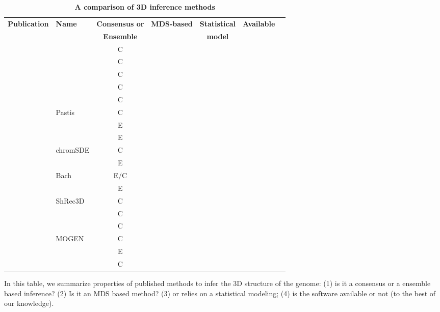 \documentclass[letterpaper,12pt]{article}
\newcommand*\CHECK{\ding{51}}
\begin{document}
\begin{table}[ht!]
\begin{center}
\footnotesize
\begin{tabular}{rlccccc}
\hline
\multirow{2}{*}{\textbf{\footnotesize Publication}} & \multirow{2}{*}{\textbf{\footnotesize Name}} &
\textbf{\footnotesize Consensus or} 
&\multirow{2}{*}{\textbf{\footnotesize MDS-based}} & \textbf{\footnotesize Statistical} &
\multirow{2}{*}{\textbf{\footnotesize Available}} \\
& & \textbf{\footnotesize Ensemble}
 & & \textbf{\footnotesize model} & \\
\hline
\hline
\footnotesize{\cite{dekker:capturing}} & & C & & & \\
\footnotesize{\cite{duan:three-dimensional}} &  & C & \CHECK & & \CHECK \\
\footnotesize{\cite{tanizawa:mapping}} & & C & \CHECK & & \\
\footnotesize{\cite{ay:three-dimensional}} & & C & \CHECK & & \\
\footnotesize{\cite{ben-elazar:spatial}} & & C & \CHECK & & \CHECK \\
\footnotesize{\cite{varoquaux:statistical}} & Pastis & C & & \CHECK & \CHECK\\
\footnotesize{\cite{bau:three-dimensional}} & & E & & &  \\
\footnotesize{\cite{umbarger:three-dimensional}} & & E  & & &\\
\footnotesize{\cite{zhang:inference}} & chromSDE & C &  \CHECK & & \CHECK\\
\footnotesize{\cite{rousseau:three}} & & E & & \CHECK & \CHECK\\
\footnotesize{\cite{hu:bayesian}} & Bach & E/C &  & \CHECK & \CHECK\\
\footnotesize{\cite{kalhor:genome}} & & E &   & &\\
\footnotesize{\cite{lesne:3d}} & ShRec3D & C  & \CHECK & & \CHECK \\
\footnotesize{\cite{trieu:large}} & & C & & & \\
\footnotesize{\cite{trieu:3D}} & & C & &  & \\
\footnotesize{\cite{trieu:MOGEN}} & MOGEN & C & & & \\
\footnotesize{\cite{nagano:single-cell}} & & E & & & \\
\footnotesize{\cite{paulsen:manifold}} & & C & \CHECK & & \CHECK \\
\hline
\end{tabular}
\end{center}
\caption{\bf A comparison of 3D inference methods}{In this table, we summarize
properties of published methods to infer the 3D structure of the genome: (1)
is it a consensus or a ensemble based inference? (2) Is it an MDS based
method? (3) or relies on a statistical modeling; (4) is the software
available or not (to the best of our knowledge).}
\end{table}
\end{document}
